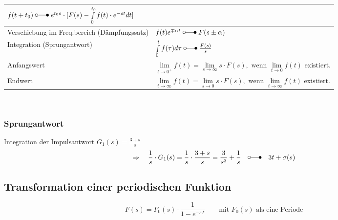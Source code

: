 \begin{tabular}{|l|l|}
  					$f(t + t_0) \; \laplace \; e^{t_0 s} \cdot [F(s) - \int\limits_0^{t_0} f(t) \cdot e^{-st} dt]$\\
  					\hline
  		 			Verschiebung im Freq.bereich (Dämpfungssatz) &
  		 			$f(t)e^{\mp\alpha t} \; \laplace \; F(s\pm\alpha)$ \\
  		 			\hline
  		 			Integration (Sprungantwort)&
  		 			$\int\limits_0^t f(\tau)d\tau \; \laplace \; \frac{F(s)}{s}$ \\
  		 			\hline
  		 			Anfangswert &
  		 			$\lim\limits_{t\rightarrow 0^+} f(t) = \lim\limits_{s\rightarrow \infty} s\cdot F(s),\text{~wenn
  		 			}  \lim\limits_{t\rightarrow 0} f(t)\text{~existiert}.$ \\
  		 			\hline
  		 			Endwert &
  		 			$\lim\limits_{t\rightarrow \infty} f(t) = \lim\limits_{s\rightarrow 0} s\cdot F(s),\text{~wenn
  		 			}  \lim\limits_{t\rightarrow \infty} f(t)\text{~existiert}.$ \\
  		 			\hline
  		       	\end{tabular}\\
  		  \renewcommand{\arraystretch}{1.8}
  				
	\subsubsection{Sprungantwort} 
	Integration der Impulsantwort $G_1(s) = \frac{3+s}{s}$\\ 
	\[\Rightarrow \quad \frac{1}{s}\cdot G_1(s)= \frac{1}{s}\cdot\frac{3+s}{s}=\frac{3}{s^2}+\frac{1}{s} \quad \laplace \quad 3t +\sigma(s)\]
	
	\subsection{Transformation einer periodischen Funktion }
		\[ F(s) = F_0(s)\cdot\dfrac{1}{1 - e^{-sT}} \qquad \text{mit } F_0(s) \text{ als eine Periode}\] 


\newpage
